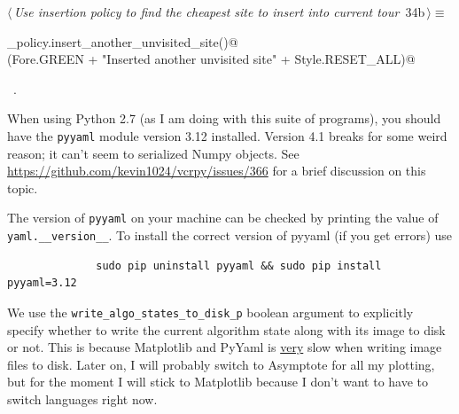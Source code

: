 \documentclass[11.5pt]{report}
\begin{document}
\begin{flushleft} \small\label{scrap40}\raggedright\small
{} $\langle\,${\itshape Use insertion policy to find the cheapest site to insert into current tour}\nobreak\ {\footnotesize {34b}}$\,\rangle\equiv$
\vspace{-1ex}
\begin{list}{}{} \item
\mbox{}\verb@insertion_policy.insert_another_unvisited_site()@\\
\mbox{}\verb@debug(Fore.GREEN + "Inserted another unvisited site" + Style.RESET_ALL)@\\
\mbox{}\verb@@{\NWsep}
\end{list}
\vspace{-1.5ex}
\footnotesize
\begin{list}{}{\setlength{\itemsep}{-\parsep}\setlength{\itemindent}{-\leftmargin}}
\item \NWtxtMacroRefIn\ .

\item{}
\end{list}
\vspace{4ex}
\end{flushleft}

\vspace{-0.8cm}\newchunk When using Python 2.7 (as I am doing with this suite of programs), you should have the 
\texttt{pyyaml} module version 3.12 installed. Version 4.1 breaks for some weird reason; it can't seem to serialized
Numpy objects. See \url{https://github.com/kevin1024/vcrpy/issues/366} for a brief discussion on this topic. 

The version of \verb|pyyaml| on your machine can be checked by printing the value of \verb|yaml.__version__|. 
To install the correct version of pyyaml (if you get errors)  use

\begin{verbatim} 
              sudo pip uninstall pyyaml && sudo pip install pyyaml=3.12
\end{verbatim}

\newchunk We use the \verb|write_algo_states_to_disk_p| boolean argument to explicitly specify whether to write 
the current algorithm state along with its image to disk or not. This is because Matplotlib and PyYaml
is \underline{very} slow when writing image files to disk. Later on, I will probably switch to Asymptote 
for all my plotting, but for the moment I will stick to Matplotlib because I don't want to have to switch languages right now. 
 
\end{document}
